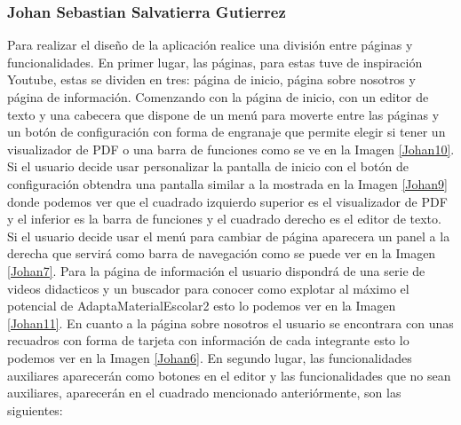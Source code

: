 \subsubsection{Johan Sebastian Salvatierra Gutierrez}
Para realizar el diseño de la aplicación realice una división entre páginas y funcionalidades. 
En primer lugar, las páginas, para estas tuve de inspiración Youtube, estas se dividen en tres: página de inicio, página sobre nosotros y página de información. Comenzando con la página de inicio, con un editor de texto y una cabecera que dispone de un menú para moverte entre las páginas y un botón de configuración con forma de engranaje que permite elegir si tener un visualizador de PDF o una barra de funciones como se ve en la Imagen \ref{Johan10}. Si el usuario decide usar personalizar la pantalla de inicio con el botón de configuración obtendra una pantalla similar a la mostrada en la Imagen \ref{Johan9} donde podemos ver que el cuadrado izquierdo superior es el visualizador de PDF y el inferior es la barra de funciones y el cuadrado derecho es el editor de texto. Si el usuario decide usar el menú para cambiar de página aparecera un panel a la derecha que servirá como barra de navegación como se puede ver en la Imagen \ref{Johan7}. Para la página de información el usuario dispondrá de una serie de videos didacticos y un buscador para conocer como explotar al máximo el potencial de AdaptaMaterialEscolar2 esto lo podemos ver en la Imagen \ref{Johan11}. En cuanto a la página sobre nosotros el usuario se encontrara con unas recuadros con forma de tarjeta con información de cada integrante esto lo podemos ver en la Imagen \ref{Johan6}.
En segundo lugar, las funcionalidades auxiliares aparecerán  como botones en el editor y las funcionalidades que no sean auxiliares, aparecerán en el cuadrado mencionado anteriórmente, son las siguientes:
